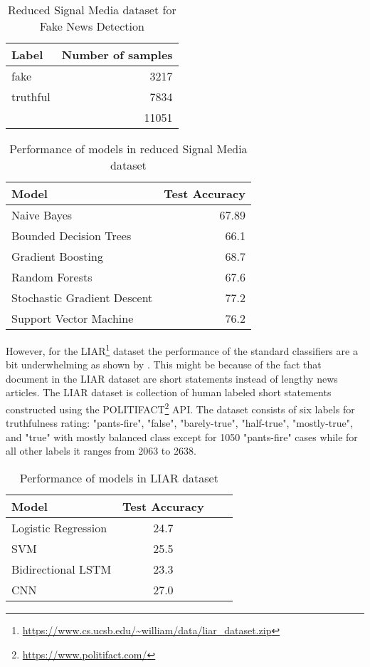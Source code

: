 \begin{table}[h]
\begin{center}
\caption{Reduced Signal Media dataset for Fake News Detection}
\label{tbl:reduced_signal_media_dataset}
\begin{tabular}{lr}
\toprule 
Label&Number of samples \\
\midrule 
fake&3217 \\
truthful&7834 \\
\midrule
&11051 \\
\bottomrule
\end{tabular}
\end{center}
\end{table}

\begin{table}[h]
\begin{center}
\caption{Performance of models in reduced Signal Media dataset}
\label{tbl:signal_media_performance}
\begin{tabular}{lr}
\toprule 
Model&Test Accuracy\\
\midrule 
Naive Bayes&67.89\\
Bounded Decision Trees&66.1\\
Gradient Boosting&68.7\\
Random Forests&67.6\\
Stochastic Gradient Descent&77.2\\
Support Vector Machine&76.2\\
\bottomrule
\end{tabular}
\end{center}
\end{table}

However, for the LIAR\footnote{\url{https://www.cs.ucsb.edu/~william/data/liar_dataset.zip}} dataset the performance of the standard classifiers are a bit underwhelming as shown by  \cite{wang2017liar}. This might be because of the fact that document in the LIAR dataset are short statements instead of lengthy news articles.
The LIAR dataset is collection of human labeled short statements constructed using the POLITIFACT\footnote{\url{https://www.politifact.com/}} API.  The dataset consists of six labels for truthfulness rating: "pants-fire", "false", "barely-true", "half-true", "mostly-true", and "true" with mostly balanced class except for 1050 "pants-fire" cases while for all other labels it ranges from 2063 to 2638. 

\begin{table}[h]
\begin{center}
\caption{Performance of models in LIAR dataset}
\label{tbl:liar_performance}
\begin{tabular}{@{}lccc@{}}
\toprule 
Model&Test Accuracy\\
\midrule 
Logistic Regression&24.7\\
SVM&25.5\\
Bidirectional LSTM&23.3\\
CNN&27.0\\
\bottomrule
\end{tabular}
\end{center}
\end{table}

